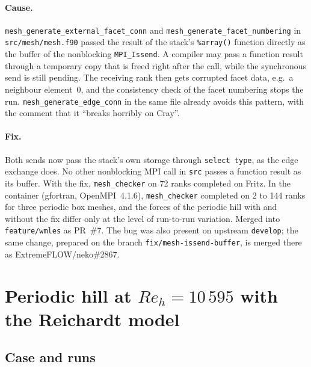 \documentclass[11pt,a4paper]{article}
\newcommand{\code}[1]{\texttt{#1}}
\begin{document}
\paragraph{Cause.} \code{mesh\_generate\_external\_facet\_conn} and
\code{mesh\_generate\_facet\_numbering} in \code{src/mesh/mesh.f90} passed
the result of the stack's \code{\%array()} function directly as the buffer of
the nonblocking \code{MPI\_Issend}. A compiler may pass a function result
through a temporary copy that is freed right after the call, while the
synchronous send is still pending. The receiving rank then gets corrupted
facet data, e.g.\ a neighbour element~0, and the consistency check of the
facet numbering stops the run. \code{mesh\_generate\_edge\_conn} in the same
file already avoids this pattern, with the comment that it ``breaks horribly
on Cray''.

\paragraph{Fix.} Both sends now pass the stack's own storage through
\code{select type}, as the edge exchange does. No other nonblocking MPI call
in \code{src} passes a function result as its buffer. With the fix,
\code{mesh\_checker} on 72 ranks completed on Fritz. In the container
(gfortran, OpenMPI~4.1.6), \code{mesh\_checker} completed on 2 to 144 ranks
for three periodic box meshes, and the forces of the periodic hill with and
without the fix differ only at the level of run-to-run variation. Merged into
\code{feature/wmles} as PR~\#7. The bug was also present on upstream
\code{develop}; the same change, prepared on the branch
\code{fix/mesh-issend-buffer}, is merged there as ExtremeFLOW/neko\#2867.

\section{Periodic hill at $Re_h = 10\,595$ with the Reichardt model}
\label{sec:hill}

\subsection{Case and runs}
\end{document}
